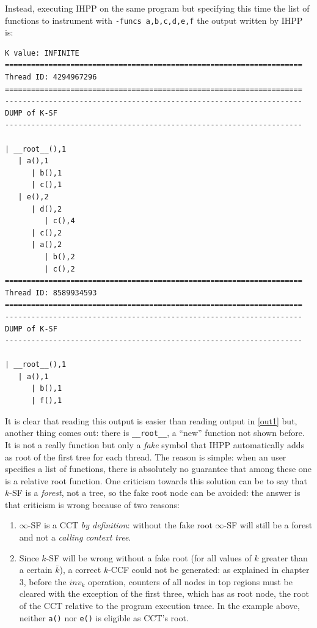 \documentclass[a4paper,11pt]{report}
\begin{document}
\renewcommand{\labelitemi}{$\bullet$}
\noindent
Instead, executing IHPP on the same program but specifying this time the list 
of functions to instrument with \verb|-funcs a,b,c,d,e,f| the output written by IHPP is:

\begin{lstlisting}[label=out2, 
caption={The output of IHPP run with selective tracing}, frame=bottomline]
K value: INFINITE
====================================================================
Thread ID: 4294967296
====================================================================
--------------------------------------------------------------------
DUMP of K-SF
--------------------------------------------------------------------

| __root__(),1
   | a(),1
      | b(),1
      | c(),1
   | e(),2
      | d(),2
         | c(),4
      | c(),2
      | a(),2
         | b(),2
         | c(),2
====================================================================
Thread ID: 8589934593
====================================================================
--------------------------------------------------------------------
DUMP of K-SF
--------------------------------------------------------------------

| __root__(),1
   | a(),1
      | b(),1
      | f(),1
\end{lstlisting}
\noindent
It is clear that reading this output is easier than reading output in \cref{out1} but,
another thing comes out: there is \verb|__root__|, a ``new'' function not shown before.
It is not a really function but only a \emph{fake} symbol that IHPP automatically adds
as root of the first tree for each thread. The reason is simple: when an user specifies 
a list of functions, there is absolutely no guarantee that among these one is a relative root function.
One criticism towards this solution can be to say that $k$-SF is a \emph{forest}, not a tree, so the fake root node can be avoided: the answer is that criticism is wrong because of two reasons:
\begin{enumerate}
\item $\infty$-SF is a CCT \emph{by definition}: without the fake root $\infty$-SF will still be a forest and not a \emph{calling context tree}. 
\item Since $k$-SF will be wrong without a fake root (for all values of $k$ greater than a certain $\bar{k}$), a correct $k$-CCF could not be generated: as explained in chapter 3, before the $inv_k$ operation, counters of all nodes
in top regions must be cleared with the exception of the first three, which has as root node, the root of the CCT relative to the program execution trace. In the example above,
neither \verb|a()| nor \verb|e()| is eligible as CCT's root.
\end{enumerate}
\end{document}

